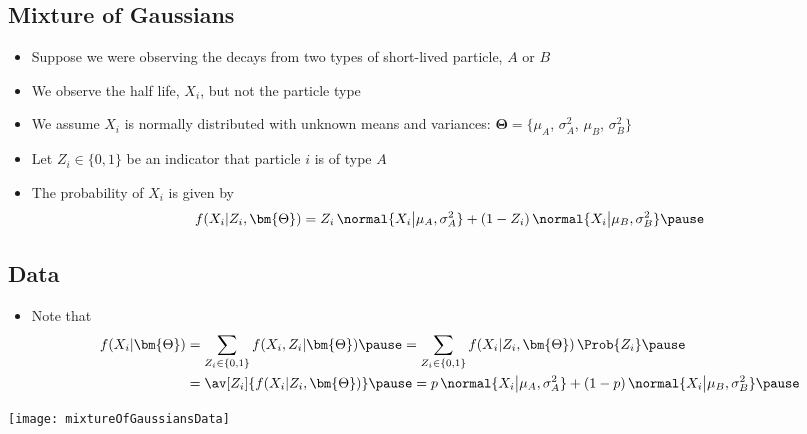 \Outline %

\begin{slide}
\section{Mixture of Gaussians}

\begin{PauseHighLight}
  \begin{itemize}
  \item Suppose we were observing the decays from two types of
    short-lived particle, $A$ or $B$\pause
  \item We observe the half life, $X_i$, but not the particle type\pause
  \item We assume $X_i$ is normally distributed with unknown means and
    variances: $\bm{\Theta} = \{\mu_A$, $\sigma_A^2$, $\mu_B$,
    $\sigma_B^2\}$\pause
  \item Let $Z_i\in\{0,1\}$ be an indicator that particle $i$ is of
    type $A$\pause
  \item The probability of $X_i$ is given by
    \begin{align*}
      f(X_i|Z_i,\bm{\Theta}) = Z_i\,\normal{X_i\big|\mu_A,\sigma_A^2} +
      (1-Z_i)\,\normal{X_i\big|\mu_B,\sigma_B^2}\pause
    \end{align*}
  \end{itemize}
\end{PauseHighLight}

\end{slide}


\begin{slide}
\section[-2]{Data}

\begin{PauseHighLight}
  \begin{itemize}
  \item Note that{\small
    \begin{align*}
      f(X_i|\bm{\Theta})
      &= \sum_{Z_i\in\{0,1\}} f(X_i,Z_i|\bm{\Theta})\pause 
        = \sum_{Z_i\in\{0,1\}}
        f(X_i|Z_i,\bm{\Theta})\,\Prob{Z_i}\pause \\
      &= \av[Z_i]{f(X_i|Z_i,\bm{\Theta})}\pause
      = p \, \normal{X_i\big|\mu_A,\sigma_A^2} +
      (1-p)\,\normal{X_i\big|\mu_B,\sigma_B^2}\pause
    \end{align*}}
  \end{itemize}
  \begin{center}
    \texttt{[image: mixtureOfGaussiansData]}\pause
  \end{center}
\end{PauseHighLight}

\end{slide}

